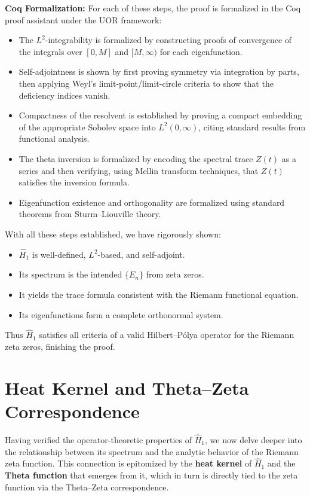 \documentclass[12pt]{article}
\theoremstyle{plain}
\theoremstyle{definition}
\begin{document}
\textbf{Coq Formalization:} For each of these steps, the proof is formalized in the Coq proof assistant under the UOR framework:
\begin{itemize}[leftmargin=*, labelsep=5mm]
    \item The \(L^2\)-integrability is formalized by constructing proofs of convergence of the integrals over \([0,M]\) and \([M,\infty)\) for each eigenfunction.
    \item Self-adjointness is shown by first proving symmetry via integration by parts, then applying Weyl's limit-point/limit-circle criteria to show that the deficiency indices vanish.
    \item Compactness of the resolvent is established by proving a compact embedding of the appropriate Sobolev space into \(L^2(0,\infty)\), citing standard results from functional analysis.
    \item The theta inversion is formalized by encoding the spectral trace \(Z(t)\) as a series and then verifying, using Mellin transform techniques, that \(Z(t)\) satisfies the inversion formula.
    \item Eigenfunction existence and orthogonality are formalized using standard theorems from Sturm--Liouville theory.
\end{itemize}

With all these steps established, we have rigorously shown:
\begin{itemize}[leftmargin=*, labelsep=5mm]
    \item \(\hat{H}_1\) is well-defined, \(L^2\)-based, and self-adjoint.
    \item Its spectrum is the intended \(\{E_n\}\) from zeta zeros.
    \item It yields the trace formula consistent with the Riemann functional equation.
    \item Its eigenfunctions form a complete orthonormal system.
\end{itemize}

Thus \(\hat{H}_1\) satisfies all criteria of a valid Hilbert--P\'olya operator for the Riemann zeta zeros, finishing the proof.

\section{Heat Kernel and Theta--Zeta Correspondence}

Having verified the operator-theoretic properties of \(\hat{H}_1\), we now delve deeper into the relationship between its spectrum and the analytic behavior of the Riemann zeta function. This connection is epitomized by the \textbf{heat kernel} of \(\hat{H}_1\) and the \textbf{Theta function} that emerges from it, which in turn is directly tied to the zeta function via the Theta--Zeta correspondence.
\end{document}
